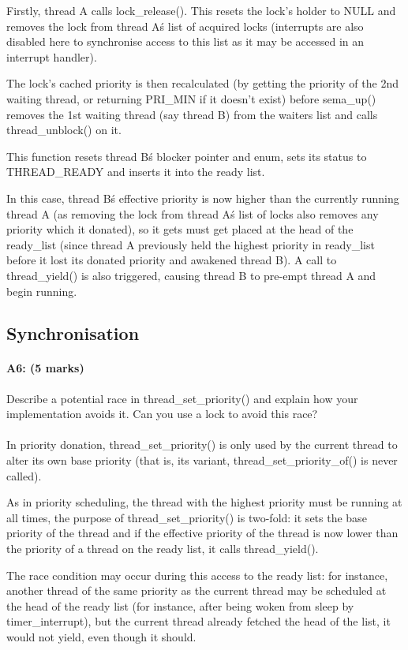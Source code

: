 Firstly, thread A calls lock\_release(). This resets the lock's holder to NULL and removes the lock from thread A\'s list of acquired locks (interrupts are also disabled here to synchronise access to this list as it may be accessed in an interrupt handler).

The lock's cached priority is then recalculated (by getting the priority of the 2nd waiting thread, or returning PRI\_MIN if it doesn't exist) before sema\_up() removes the 1st waiting thread (say thread B) from the waiters list and calls thread\_unblock() on it.

This function resets thread B\'s blocker pointer and enum, sets its status to THREAD\_READY and inserts it into the ready list.

In this case, thread B\'s effective priority is now higher than the currently running thread A (as removing the lock from thread A\'s list of locks also removes any priority which it donated), so it gets must get placed at the head of the ready\_list (since thread A previously held the highest priority in ready\_list before it lost its donated priority and awakened thread B). A call to thread\_yield() is also triggered, causing thread B to pre-empt thread A and begin running.

\subsection{Synchronisation}
\paragraph{A6: (5 marks)}
Describe a potential race in thread\_set\_priority() and explain how your implementation avoids it.  Can you use a lock to avoid this race?
\\
\\
In priority donation, thread\_set\_priority() is only used by the current thread to alter its own base priority (that is, its variant, thread\_set\_priority\_of() is never called).

As in priority scheduling, the thread with the highest priority must be running at all times, the purpose of thread\_set\_priority() is two-fold: it sets the base priority of the thread and if the effective priority of the thread is now lower than the priority of a thread on the ready list, it calls thread\_yield().

The race condition may occur during this access to the ready list: for instance, another thread of the same priority as the current thread may be scheduled at the head of the ready list (for instance, after being woken from sleep by timer\_interrupt), but the current thread already fetched the head of the list, it would not yield, even though it should.

